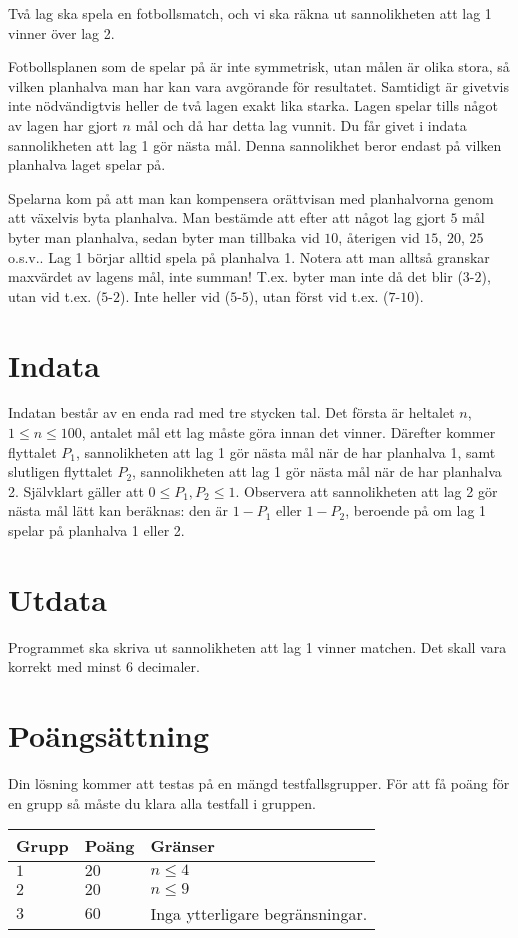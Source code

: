 
Två lag ska spela en fotbollsmatch, och vi ska räkna ut sannolikheten att lag 1 vinner över lag 2.

Fotbollsplanen som de spelar på är inte symmetrisk, utan målen är olika stora, så vilken planhalva man har kan vara avgörande för resultatet. Samtidigt är givetvis inte nödvändigtvis heller de två lagen exakt lika starka. Lagen spelar tills något av lagen har gjort $n$ mål och då har detta lag vunnit. Du får givet i indata sannolikheten att lag 1 gör nästa mål. Denna sannolikhet beror endast på vilken planhalva laget spelar på.

Spelarna kom på att man kan kompensera orättvisan med planhalvorna genom att växelvis byta planhalva. Man bestämde att efter att något lag gjort $5$ mål byter man planhalva, sedan byter man tillbaka vid $10$, återigen vid $15$, $20$, $25$ o.s.v.. Lag 1 börjar alltid spela på planhalva 1. Notera att man alltså granskar maxvärdet av lagens mål, inte summan! T.ex. byter man inte då det blir ($3$-$2$), utan vid t.ex. ($5$-$2$). Inte heller vid ($5$-$5$), utan först vid t.ex. ($7$-$10$).

\section*{Indata}
Indatan består av en enda rad med tre stycken tal. Det första är heltalet $n$, $1 \leq n \leq 100$, antalet mål ett lag måste göra innan det vinner. Därefter kommer flyttalet $P_1$, sannolikheten att lag 1 gör nästa mål när de har planhalva 1, samt slutligen flyttalet $P_2$, sannolikheten att lag 1 gör nästa mål när de har planhalva 2. Självklart gäller att $0 \leq P_1, P_2 \leq 1$. Observera att sannolikheten att lag 2 gör nästa mål lätt kan beräknas: den är $1 - P_1$ eller $1 - P_2$, beroende på om lag 1 spelar på planhalva 1 eller 2.

\section*{Utdata}
Programmet ska skriva ut sannolikheten att lag 1 vinner matchen. Det skall vara korrekt med minst $6$ decimaler.

\section*{Poängsättning}
Din lösning kommer att testas på en mängd testfallsgrupper.
För att få poäng för en grupp så måste du klara alla testfall i gruppen.


\noindent
\begin{tabular}{| l | l | p{12cm} |}
  \hline
  \textbf{Grupp} & \textbf{Poäng} & \textbf{Gränser} \\ \hline
  $1$    & $20$          & $n \leq 4$  \\ \hline
  $2$    & $20$          & $n \leq 9$  \\ \hline
  $3$    & $60$          & Inga ytterligare begränsningar.  \\ \hline
\end{tabular}
